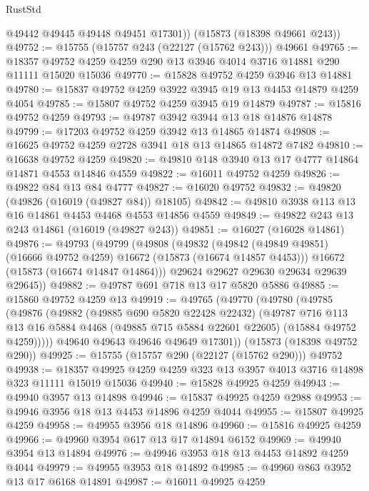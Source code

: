 \begin{lexlean}{RustStd}
\begin{coremodule}
        @49442
        @49445
        @49448
        @49451
        @17301))
    (@15873 (@18398 @49661 @243))
@49752 := @15755 (@15757 @243 (@22127 (@15762 @243))) @49661
@49765 := @18357 @49752 @4259 @4259 @290 @13 @3946 @4014 @3716 @14881 @290 @11111 @15020 @15036
@49770 := @15828 @49752 @4259 @3946 @13 @14881
@49780 := @15837 @49752 @4259 @3922 @3945 @19 @13 @4453 @14879 @4259 @4054
@49785 := @15807 @49752 @4259 @3945 @19 @14879
@49787 := @15816 @49752 @4259
@49793 := @49787 @3942 @3944 @13 @18 @14876 @14878
@49799 := @17203 @49752 @4259 @3942 @13 @14865 @14874
@49808 := @16625 @49752 @4259 @2728 @3941 @18 @13 @14865 @14872 @7482
@49810 := @16638 @49752 @4259
@49820 := @49810 @148 @3940 @13 @17 @4777 @14864 @14871 @4553 @14846 @4559
@49822 := @16011 @49752 @4259
@49826 := @49822 @84 @13 @84 @4777
@49827 := @16020 @49752
@49832 := @49820 (@49826 (@16019 (@49827 @84)) @18105)
@49842 := @49810 @3938 @113 @13 @16 @14861 @4453 @4468 @4553 @14856 @4559
@49849 := @49822 @243 @13 @243 @14861 (@16019 (@49827 @243))
@49851 := @16027 (@16028 @14861)
@49876 := @49793
    (@49799
      (@49808
        (@49832
          (@49842 (@49849 @49851) (@16666 @49752 @4259) @16672 (@15873 (@16674 @14857 @4453)))
          @16672
          (@15873 (@16674 @14847 @14864)))
        @29624
        @29627
        @29630
        @29634
        @29639
        @29645))
@49882 := @49787 @691 @718 @13 @17 @5820 @5886
@49885 := @15860 @49752 @4259 @13
@49919 := @49765
    (@49770
      (@49780
        (@49785
          (@49876
            (@49882
              (@49885 @690 @5820 @22428 @22432)
              (@49787
                @716
                @113
                @13
                @16
                @5884
                @4468
                (@49885 @715 @5884 @22601 @22605)
                (@15884 @49752 @4259)))))
        @49640
        @49643
        @49646
        @49649
        @17301))
    (@15873 (@18398 @49752 @290))
@49925 := @15755 (@15757 @290 (@22127 (@15762 @290))) @49752
@49938 := @18357 @49925 @4259 @4259 @323 @13 @3957 @4013 @3716 @14898 @323 @11111 @15019 @15036
@49940 := @15828 @49925 @4259
@49943 := @49940 @3957 @13 @14898
@49946 := @15837 @49925 @4259 @2988
@49953 := @49946 @3956 @18 @13 @4453 @14896 @4259 @4044
@49955 := @15807 @49925 @4259
@49958 := @49955 @3956 @18 @14896
@49960 := @15816 @49925 @4259
@49966 := @49960 @3954 @617 @13 @17 @14894 @6152
@49969 := @49940 @3954 @13 @14894
@49976 := @49946 @3953 @18 @13 @4453 @14892 @4259 @4044
@49979 := @49955 @3953 @18 @14892
@49985 := @49960 @863 @3952 @13 @17 @6168 @14891
@49987 := @16011 @49925 @4259

\end{coremodule}
\end{lexlean}
